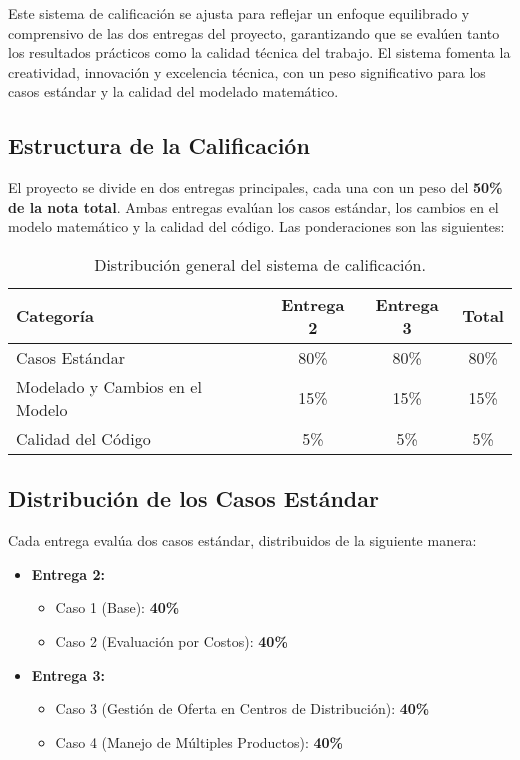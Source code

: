 \documentclass[12pt]{article}
\begin{document}
Este sistema de calificación se ajusta para reflejar un enfoque equilibrado y comprensivo de las dos entregas del proyecto, garantizando que se evalúen tanto los resultados prácticos como la calidad técnica del trabajo. El sistema fomenta la creatividad, innovación y excelencia técnica, con un peso significativo para los casos estándar y la calidad del modelado matemático.

\subsection{Estructura de la Calificación}

El proyecto se divide en dos entregas principales, cada una con un peso del \textbf{50\% de la nota total}. Ambas entregas evalúan los casos estándar, los cambios en el modelo matemático y la calidad del código. Las ponderaciones son las siguientes:

\begin{table}[h!]
\centering
\begin{tabular}{|l|c|c|c|}
\hline
\textbf{Categoría} & \textbf{Entrega 2} & \textbf{Entrega 3} & \textbf{Total} \\ \hline
Casos Estándar & 80\% & 80\% & 80\% \\ \hline
Modelado y Cambios en el Modelo & 15\% & 15\% & 15\% \\ \hline
Calidad del Código & 5\% & 5\% & 5\% \\ \hline
\end{tabular}
\caption{Distribución general del sistema de calificación.}
\label{table:calificacion}
\end{table}

\subsection{Distribución de los Casos Estándar}

Cada entrega evalúa dos casos estándar, distribuidos de la siguiente manera:
\begin{itemize}
    \item \textbf{Entrega 2:}
    \begin{itemize}
        \item Caso 1 (Base): \textbf{40\%}
        \item Caso 2 (Evaluación por Costos): \textbf{40\%}
    \end{itemize}
    \item \textbf{Entrega 3:}
    \begin{itemize}
        \item Caso 3 (Gestión de Oferta en Centros de Distribución): \textbf{40\%}
        \item Caso 4 (Manejo de Múltiples Productos): \textbf{40\%}
    \end{itemize}
\end{itemize}
\end{document}
